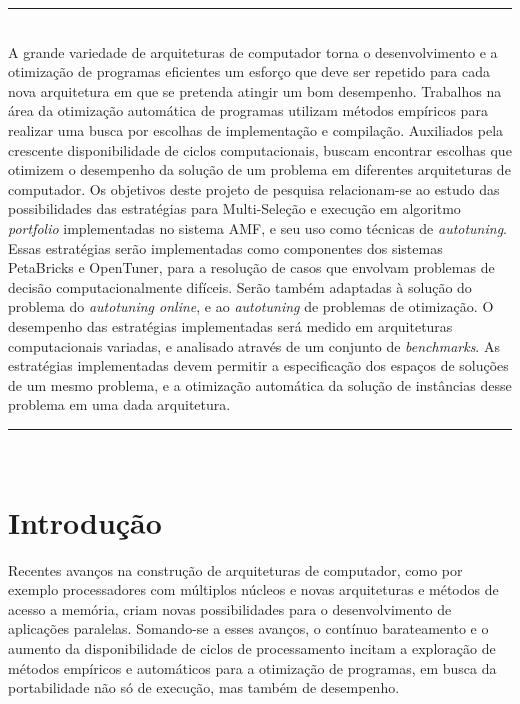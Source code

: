 \documentclass[a4paper, 11pt]{article}
\begin{document}
\abstract
\noindent
\rule{\linewidth}{.1mm} \\
\noindent
A grande variedade de arquiteturas de computador torna o desenvolvimento e a 
otimização de programas eficientes um esforço que deve ser repetido para cada 
nova arquitetura em que se pretenda atingir um bom desempenho.
Trabalhos na área da otimização automática de programas utilizam métodos 
empíricos para realizar uma busca por escolhas de implementação e compilação.
Auxiliados pela crescente disponibilidade de ciclos computacionais,
buscam encontrar escolhas que otimizem o desempenho da solução de um problema
em diferentes arquiteturas de computador. Os objetivos deste projeto de 
pesquisa relacionam-se ao estudo das possibilidades das estratégias para 
Multi-Seleção e execução em algoritmo \emph{portfolio} implementadas no sistema
AMF, e seu uso como técnicas de \emph{autotuning}.
Essas estratégias serão implementadas como componentes dos sistemas PetaBricks
e OpenTuner, para a resolução de casos que envolvam problemas de decisão 
computacionalmente difíceis. 
Serão também adaptadas à solução do problema do \emph{autotuning online}, e ao 
\emph{autotuning} de problemas de otimização.
O desempenho das estratégias implementadas será medido em arquiteturas 
computacionais variadas, e analisado através de um conjunto de 
\emph{benchmarks}. As estratégias implementadas devem permitir a especificação
dos espaços de soluções de um mesmo problema, e a otimização automática da 
solução de instâncias desse problema em uma dada arquitetura.

\noindent
\rule{\linewidth}{.1mm} \\

\tableofcontents

\newpage

\section{Introdução} \label{sec:intro}

Recentes avanços na construção de arquiteturas de computador, como
por exemplo processadores com múltiplos núcleos e novas arquiteturas
e métodos de acesso a memória, criam novas possibilidades para o 
desenvolvimento de aplicações paralelas. Somando-se a esses avanços, o contínuo
barateamento e o aumento da disponibilidade de ciclos de processamento incitam 
a exploração de métodos empíricos e automáticos para a otimização de programas,
em busca da portabilidade não só de execução, mas também de desempenho. 
\end{document}

